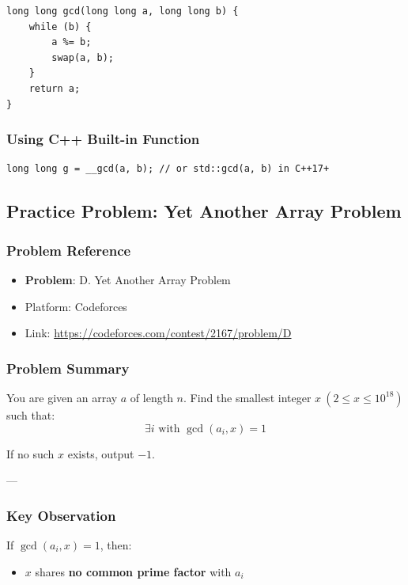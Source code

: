 \documentclass[11pt]{article}
\begin{document}
\begin{lstlisting}
long long gcd(long long a, long long b) {
    while (b) {
        a %= b;
        swap(a, b);
    }
    return a;
}
\end{lstlisting}

\subsubsection{Using C++ Built-in Function}

\begin{lstlisting}
long long g = __gcd(a, b); // or std::gcd(a, b) in C++17+
\end{lstlisting}

\subsection{Practice Problem: Yet Another Array Problem}

\subsubsection{Problem Reference}

\begin{itemize}
    \item \textbf{Problem}: D. Yet Another Array Problem
    \item Platform: Codeforces
    \item Link: \url{https://codeforces.com/contest/2167/problem/D}
\end{itemize}

\subsubsection{Problem Summary}

You are given an array $a$ of length $n$.
Find the smallest integer $x \ (2 \le x \le 10^{18})$ such that:
\[
\exists i \text{ with } \gcd(a_i, x) = 1
\]

If no such $x$ exists, output $-1$.

---

\subsubsection{Key Observation}

If $\gcd(a_i, x) = 1$, then:
\begin{itemize}
    \item $x$ shares \textbf{no common prime factor} with $a_i$
\end{itemize}
\end{document}
